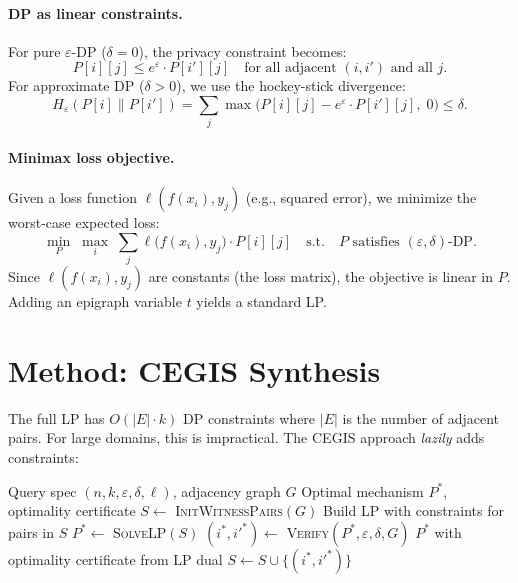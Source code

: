 \documentclass[11pt,a4paper]{article}
\begin{document}
\paragraph{DP as linear constraints.}
For pure $\varepsilon$-DP ($\delta = 0$), the privacy constraint becomes:
\begin{equation}
  P[i][j] \le e^\varepsilon \cdot P[i'][j]
  \quad \text{for all adjacent } (i, i') \text{ and all } j.
  \label{eq:pure-dp}
\end{equation}
For approximate DP ($\delta > 0$), we use the hockey-stick divergence:
\begin{equation}
  H_\varepsilon(P[i] \| P[i']) = \sum_j \max\bigl(P[i][j] - e^\varepsilon \cdot P[i'][j],\; 0\bigr) \le \delta.
  \label{eq:approx-dp}
\end{equation}

\paragraph{Minimax loss objective.}
Given a loss function $\ell(f(x_i), y_j)$ (e.g., squared error), we minimize
the worst-case expected loss:
\begin{equation}
  \min_P \;\max_i \;\sum_j \ell\bigl(f(x_i), y_j\bigr) \cdot P[i][j]
  \quad\text{s.t.}\quad P \text{ satisfies } (\varepsilon,\delta)\text{-DP}.
  \label{eq:minimax}
\end{equation}
Since $\ell(f(x_i), y_j)$ are constants (the loss matrix), the objective is
linear in $P$.  Adding an epigraph variable $t$ yields a standard LP.

\section{Method: CEGIS Synthesis}
\label{sec:method}

The full LP has $O(|E| \cdot k)$ DP constraints where $|E|$ is the number of
adjacent pairs.  For large domains, this is impractical.  The CEGIS approach
\emph{lazily} adds constraints:

\begin{algorithm}[h]
\caption{CEGIS Mechanism Synthesis}
\label{alg:cegis}
\begin{algorithmic}[1]
\Require Query spec $(n, k, \varepsilon, \delta, \ell)$, adjacency graph $G$
\Ensure Optimal mechanism $P^*$, optimality certificate
\State $S \gets$ \textsc{InitWitnessPairs}$(G)$
\State Build LP with constraints for pairs in $S$
\Repeat
  \State $P^* \gets$ \textsc{SolveLP}$(S)$
  \State $(i^*, i'^*) \gets$ \textsc{Verify}$(P^*, \varepsilon, \delta, G)$
    \State \Return $P^*$ with optimality certificate from LP dual
  \EndIf
  \State $S \gets S \cup \{(i^*, i'^*)\}$
\end{algorithmic}
\end{algorithm}
\end{document}
